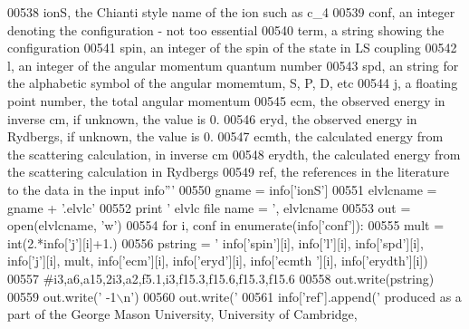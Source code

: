 \begin{DoxyCode}
{{{{{{00538 \textcolor{stringliteral}{    ionS, the Chianti style name of the ion such as c\_4}
00539 \textcolor{stringliteral}{    conf, an integer denoting the configuration - not too essential}
00540 \textcolor{stringliteral}{    term, a string showing the configuration}
00541 \textcolor{stringliteral}{    spin, an integer of the spin of the state in LS coupling}
00542 \textcolor{stringliteral}{    l, an integer of the angular momentum quantum number}
00543 \textcolor{stringliteral}{    spd, an string for the alphabetic symbol of the angular momemtum, S, P, D, etc}
00544 \textcolor{stringliteral}{    j, a floating point number, the total angular momentum}
00545 \textcolor{stringliteral}{    ecm, the observed energy in inverse cm, if unknown, the value is 0.}
00546 \textcolor{stringliteral}{    eryd, the observed energy in Rydbergs, if unknown, the value is 0.}
00547 \textcolor{stringliteral}{    ecmth, the calculated energy from the scattering calculation, in inverse cm}
00548 \textcolor{stringliteral}{    erydth, the calculated energy from the scattering calculation in Rydbergs}
00549 \textcolor{stringliteral}{    ref, the references in the literature to the data in the input info'''}
00550     gname = info[\textcolor{stringliteral}{'ionS'}]
00551     elvlcname = gname + \textcolor{stringliteral}{'.elvlc'}
00552     \textcolor{keywordflow}{print} \textcolor{stringliteral}{' elvlc file name = '}, elvlcname
00553     out = open(elvlcname, \textcolor{stringliteral}{'w'})
00554     \textcolor{keywordflow}{for} i,  conf \textcolor{keywordflow}{in} enumerate(info[\textcolor{stringliteral}{'conf'}]):
00555         mult = int(2.*info[\textcolor{stringliteral}{'j'}][i]+1.)
00556         pstring = \textcolor{stringliteral}{'%
      info[\textcolor{stringliteral}{'spin'}][i], info[\textcolor{stringliteral}{'l'}][i], info[\textcolor{stringliteral}{'spd'}][i], info[\textcolor{stringliteral}{'j'}][i], mult, info[\textcolor{stringliteral}{'ecm'}][i], info[\textcolor{stringliteral}{'eryd'}][i], info[\textcolor{stringliteral}{'ecmth
      '}][i], info[\textcolor{stringliteral}{'erydth'}][i])
00557     \textcolor{comment}{#i3,a6,a15,2i3,a2,f5.1,i3,f15.3,f15.6,f15.3,f15.6}
00558         out.write(pstring)
00559     out.write(\textcolor{stringliteral}{' -1\(\backslash\)n'})
00560     out.write(\textcolor{stringliteral}{'%
00561     info[\textcolor{stringliteral}{'ref'}].append(\textcolor{stringliteral}{' produced as a part of the George Mason University, University of Cambridge,
}}}}}}}}}
\end{DoxyCode}
